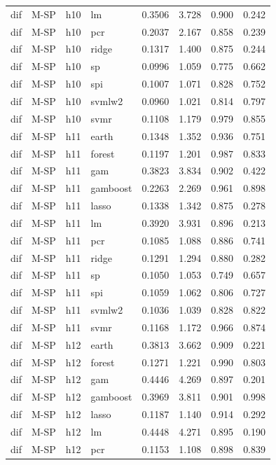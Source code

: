 \begin{ThreePartTable}
\begin{longtable}[t]{llclcccc}
dif & M-SP & h10 & lm & 0.3506 & 3.728 & 0.900 & 0.242\\
dif & M-SP & h10 & pcr & 0.2037 & 2.167 & 0.858 & 0.239\\
dif & M-SP & h10 & ridge & 0.1317 & 1.400 & 0.875 & 0.244\\
dif & M-SP & h10 & sp & 0.0996 & 1.059 & 0.775 & 0.662\\
dif & M-SP & h10 & spi & 0.1007 & 1.071 & 0.828 & 0.752\\
dif & M-SP & h10 & svmlw2 & 0.0960 & 1.021 & 0.814 & 0.797\\
dif & M-SP & h10 & svmr & 0.1108 & 1.179 & 0.979 & 0.855\\
\addlinespace
dif & M-SP & h11 & earth & 0.1348 & 1.352 & 0.936 & 0.751\\
dif & M-SP & h11 & forest & 0.1197 & 1.201 & 0.987 & 0.833\\
dif & M-SP & h11 & gam & 0.3823 & 3.834 & 0.902 & 0.422\\
dif & M-SP & h11 & gamboost & 0.2263 & 2.269 & 0.961 & 0.898\\
dif & M-SP & h11 & lasso & 0.1338 & 1.342 & 0.875 & 0.278\\
dif & M-SP & h11 & lm & 0.3920 & 3.931 & 0.896 & 0.213\\
dif & M-SP & h11 & pcr & 0.1085 & 1.088 & 0.886 & 0.741\\
dif & M-SP & h11 & ridge & 0.1291 & 1.294 & 0.880 & 0.282\\
dif & M-SP & h11 & sp & 0.1050 & 1.053 & 0.749 & 0.657\\
dif & M-SP & h11 & spi & 0.1059 & 1.062 & 0.806 & 0.727\\
dif & M-SP & h11 & svmlw2 & 0.1036 & 1.039 & 0.828 & 0.822\\
dif & M-SP & h11 & svmr & 0.1168 & 1.172 & 0.966 & 0.874\\
\addlinespace
dif & M-SP & h12 & earth & 0.3813 & 3.662 & 0.909 & 0.221\\
dif & M-SP & h12 & forest & 0.1271 & 1.221 & 0.990 & 0.803\\
dif & M-SP & h12 & gam & 0.4446 & 4.269 & 0.897 & 0.201\\
dif & M-SP & h12 & gamboost & 0.3969 & 3.811 & 0.901 & 0.998\\
dif & M-SP & h12 & lasso & 0.1187 & 1.140 & 0.914 & 0.292\\
dif & M-SP & h12 & lm & 0.4448 & 4.271 & 0.895 & 0.190\\
dif & M-SP & h12 & pcr & 0.1153 & 1.108 & 0.898 & 0.839\\

\end{longtable}
\end{ThreePartTable}
